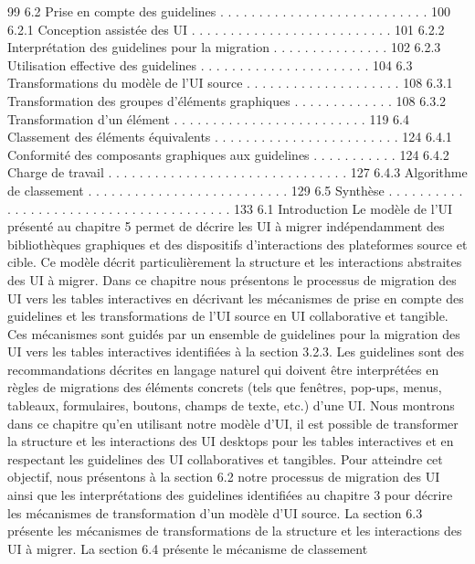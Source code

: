 \documentclass{article}
\begin{document}
99
6.2
Prise en compte des guidelines . . . . . . . . . . . . . . . . . . . . . . . . . . . 100
6.2.1
Conception assistée des UI . . . . . . . . . . . . . . . . . . . . . . . . . . 101
6.2.2
Interprétation des guidelines pour la migration
. . . . . . . . . . . . . . . 102
6.2.3
Utilisation effective des guidelines . . . . . . . . . . . . . . . . . . . . . . 104
6.3
Transformations du modèle de l’UI source
. . . . . . . . . . . . . . . . . . . . 108
6.3.1
Transformation des groupes d’éléments graphiques . . . . . . . . . . . . . 108
6.3.2
Transformation d’un élément . . . . . . . . . . . . . . . . . . . . . . . . . 119
6.4
Classement des éléments équivalents . . . . . . . . . . . . . . . . . . . . . . . . 124
6.4.1
Conformité des composants graphiques aux guidelines . . . . . . . . . . . 124
6.4.2
Charge de travail . . . . . . . . . . . . . . . . . . . . . . . . . . . . . . . 127
6.4.3
Algorithme de classement . . . . . . . . . . . . . . . . . . . . . . . . . . 129
6.5
Synthèse
. . . . . . . . . . . . . . . . . . . . . . . . . . . . . . . . . . . . . . . 133
6.1
Introduction
Le modèle de l’UI présenté au chapitre 5 permet de décrire les UI à migrer indépendamment des
bibliothèques graphiques et des dispositifs d’interactions des plateformes source et cible. Ce modèle
décrit particulièrement la structure et les interactions abstraites des UI à migrer. Dans ce chapitre nous
présentons le processus de migration des UI vers les tables interactives en décrivant les mécanismes
de prise en compte des guidelines et les transformations de l’UI source en UI collaborative et tangible.
Ces mécanismes sont guidés par un ensemble de guidelines pour la migration des UI vers les tables
interactives identiﬁées à la section 3.2.3. Les guidelines sont des recommandations décrites en langage
naturel qui doivent être interprétées en règles de migrations des éléments concrets (tels que fenêtres,
pop-ups, menus, tableaux, formulaires, boutons, champs de texte, etc.) d’une UI.
Nous montrons dans ce chapitre qu’en utilisant notre modèle d’UI, il est possible de transformer la
structure et les interactions des UI desktops pour les tables interactives et en respectant les guidelines
des UI collaboratives et tangibles.
Pour atteindre cet objectif, nous présentons à la section 6.2 notre processus de migration des UI
ainsi que les interprétations des guidelines identiﬁées au chapitre 3 pour décrire les mécanismes de
transformation d’un modèle d’UI source. La section 6.3 présente les mécanismes de transformations
de la structure et les interactions des UI à migrer. La section 6.4 présente le mécanisme de classement
\end{document}

